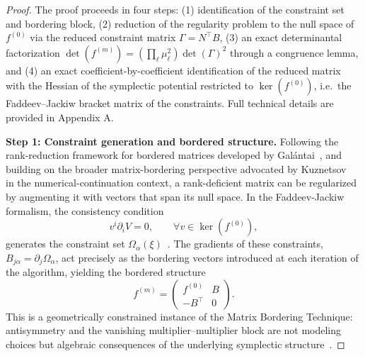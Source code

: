 \documentclass[11pt,a4paper]{article}
\begin{document}
	
	
	\begin{proof}
		The proof proceeds in four steps: (1) identification of the constraint set and bordering block, (2) reduction of the regularity problem to the null space of $f^{(0)}$ via the reduced constraint matrix $\Gamma = N^{\top}B$, (3) an exact determinantal factorization $\det(f^{(m)}) = (\prod_\ell\mu_\ell^2)\det(\Gamma)^2$ through a congruence lemma, and (4) an exact coefficient-by-coefficient identification of the reduced matrix with the Hessian of the symplectic potential restricted to $\ker(f^{(0)})$, i.e.\ the Faddeev--Jackiw bracket matrix of the constraints. Full technical details are provided in Appendix A.
		
		\smallskip
		\textbf{Step 1: Constraint generation and bordered structure.}
		Following the rank-reduction framework for bordered matrices developed by Galántai~\cite{Galantai2001}, and building on the broader matrix-bordering perspective advocated by Kuznetsov~\cite{Kuznetsov2004} in the numerical-continuation context, a rank-deficient matrix can be regularized by augmenting it with vectors that span its null space. In the Faddeev-Jackiw formalism, the consistency condition
		\[
		v^i \partial_i V = 0,
		\qquad \forall v \in \ker(f^{(0)}),
		\]
		generates the constraint set $\Omega_\alpha(\xi)$~\cite{FaddeevJackiw1988,BarcelosNetoWotzasek1992}. The gradients of these constraints, $B_{j\alpha} = \partial_j \Omega_\alpha$, act precisely as the bordering vectors introduced at each iteration of the algorithm, yielding the bordered structure
		\[
		f^{(m)} =
		\begin{pmatrix}
			f^{(0)} & B \\
			- B^\top & 0
		\end{pmatrix}.
		\]
		This is a geometrically constrained instance of the Matrix Bordering Technique: antisymmetry and the vanishing multiplier--multiplier block are not modeling choices but algebraic consequences of the underlying symplectic structure~\cite{ArnoldBook,Marsden1999,AbrahamMarsden1978}.
		

\end{proof}
\end{document}
